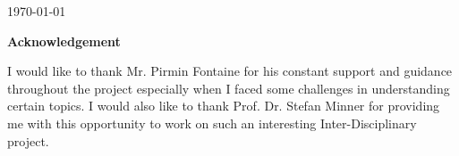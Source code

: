 \documentclass[a4paper, 12pt]{article}
\begin{document}
\begin{titlepage}


{\large \today}\\[2cm] %

\end{titlepage}

\begin{center}
\huge \bfseries Acknowledgement
\end{center}
\thispagestyle{empty}
\vspace{35mm}
I would like to thank Mr. Pirmin Fontaine for his constant support and guidance throughout the project especially when I faced some challenges in understanding certain topics. I would also like to thank Prof. Dr. Stefan Minner for providing me with this opportunity to work on such an interesting Inter-Disciplinary project.

\newpage
\end{document}
